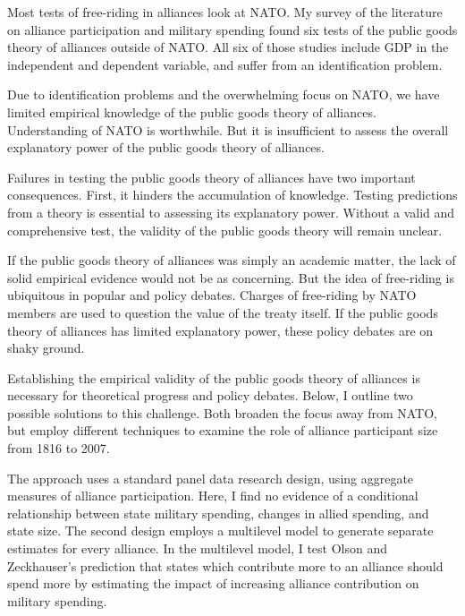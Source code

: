 \documentclass[12pt]{article}
\begin{document}
Most tests of free-riding in alliances look at NATO. 
My survey of the literature on alliance participation and military spending found six tests of the public goods theory of alliances outside of NATO. 
All six of those studies include GDP in the independent and dependent variable, and suffer from an identification problem. 


Due to identification problems and the overwhelming focus on NATO, we have limited empirical knowledge of the public goods theory of alliances. 
Understanding of NATO is worthwhile. 
But it is insufficient to assess the overall explanatory power of the public goods theory of alliances. 


Failures in testing the public goods theory of alliances have two important consequences. 
First, it hinders the accumulation of knowledge. 
Testing predictions from a theory is essential to assessing its explanatory power. 
Without a valid and comprehensive test, the validity of the public goods theory will remain unclear. 


If the public goods theory of alliances was simply an academic matter, the lack of solid empirical evidence would not be as concerning. 
But the idea of free-riding is ubiquitous in popular and policy debates. 
Charges of free-riding by NATO members are used to question the value of the treaty itself. 
If the public goods theory of alliances has limited explanatory power, these policy debates are on shaky ground. 


Establishing the empirical validity of the public goods theory of alliances is necessary for theoretical progress and policy debates. 
Below, I outline two possible solutions to this challenge. 
Both broaden the focus away from NATO, but employ different techniques to examine the role of alliance participant size from 1816 to 2007. 


The approach uses a standard panel data research design, using aggregate measures of alliance participation.
Here, I find no evidence of a conditional relationship between state military spending, changes in allied spending, and state size. 
The second design employs a multilevel model to generate separate estimates for every alliance. 
In the multilevel model, I test Olson and Zeckhauser's prediction that states which contribute more to an alliance should spend more by estimating the impact of increasing alliance contribution on military spending. 
\end{document}

